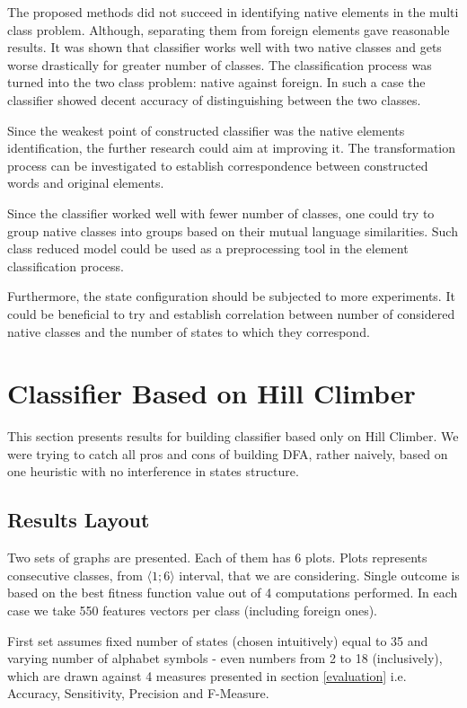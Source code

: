 \documentclass{mini}
\begin{document}
The proposed methods did not succeed in identifying native elements in the multi class problem. Although, separating them from foreign elements gave reasonable results. It was shown that classifier works well with two native classes and gets worse drastically for greater number of classes. The classification process was turned into the two class problem: native against foreign. In such a case the classifier showed decent accuracy of distinguishing between the two classes.

Since the weakest point of constructed classifier was the native elements identification, the further research could aim at improving it. The transformation process can be investigated to establish correspondence between constructed words and original elements.

Since the classifier worked well with fewer number of classes, one could try to group native classes into groups based on their mutual language similarities. Such class reduced model could be used as a preprocessing tool in the element classification process. 

Furthermore, the state configuration should be subjected to more experiments.
It could be beneficial to try and establish correlation between number of considered native classes and the number of states to which they correspond.


%
%
\section{Classifier Based on Hill Climber}
This section presents results for building classifier based only on Hill Climber. We were trying to catch all pros and cons of building DFA, rather naively, based on one heuristic with no interference in states structure. 

\subsection{Results Layout}
Two sets of graphs are presented. Each of them has 6 plots. Plots represents consecutive classes, from $\langle1;6\rangle$ interval, that we are considering. Single outcome is based on the best fitness function value out of 4 computations performed. In each case we take 550 features vectors per class (including foreign ones). 

First set assumes fixed number of states (chosen intuitively) equal to 35 and varying number of alphabet symbols - even numbers from 2 to 18 (inclusively), which are drawn against 4 measures presented in section \ref{evaluation} i.e. Accuracy, Sensitivity, Precision and F-Measure. 
\end{document}
